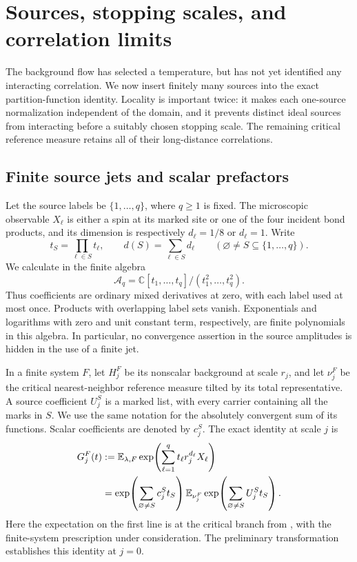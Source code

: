 \section{Sources, stopping scales, and correlation limits}
\label{sec:correlations}

The background flow has selected a temperature, but has not yet identified
any interacting correlation. We now insert finitely many sources into the
exact partition-function identity. Locality is important twice: it makes
each one-source normalization independent of the domain, and it prevents
distinct ideal sources from interacting before a suitably chosen stopping
scale. The remaining critical reference measure retains all of their
long-distance correlations.

\subsection{Finite source jets and scalar prefactors}

Let the source labels be $\{1,\ldots,q\}$, where $q\geq1$ is fixed.
The microscopic observable $X_\ell$ is either a spin at its marked site or
one of the four incident bond products, and its dimension is respectively
$d_\ell=1/8$ or $d_\ell=1$. Write
\[
 t_S=\prod_{\ell\in S}t_\ell,
 \qquad d(S)=\sum_{\ell\in S}d_\ell
 \qquad(\varnothing\ne S\subseteq\{1,\ldots,q\}).
\]
We calculate in the finite algebra
\[
 \mathcal A_q=\mathbb C[t_1,\ldots,t_q]/(t_1^2,\ldots,t_q^2).
\]
Thus coefficients are ordinary mixed derivatives at zero, with each label
used at most once. Products with overlapping label sets vanish. Exponentials
and logarithms with zero and unit constant term, respectively, are finite
polynomials in this algebra. In particular, no convergence assertion in
the source amplitudes is hidden in the use of a finite jet.

In a finite system $F$, let $H_j^F$ be its nonscalar background at scale
$r_j$, and let $\nu_j^F$ be the critical nearest-neighbor reference measure
tilted by its total representative. A source coefficient $U_j^S$ is a
marked list, with every carrier containing all the marks in $S$. We use
the same notation for the absolutely convergent sum of its functions.
Scalar coefficients are denoted by $c_j^S$. The exact identity at scale
$j$ is
\begin{equation}
 \begin{split}
 G_j^F(t)
 &:={\mathbb E}_{\lambda,F}
       \exp\!\left(\sum_{\ell=1}^q t_\ell r_j^{d_\ell}X_\ell\right)\\
 &=\exp\!\left(\sum_{\varnothing\ne S}c_j^S t_S\right)
   {\mathbb E}_{\nu_j^F}
       \exp\!\left(\sum_{\varnothing\ne S}U_j^S t_S\right).
 \end{split}
 \label{src:partition-jet}
\end{equation}
Here the expectation on the first line is at the critical branch from
, with the finite-system prescription under consideration.
The preliminary transformation establishes this identity at $j=0$.

